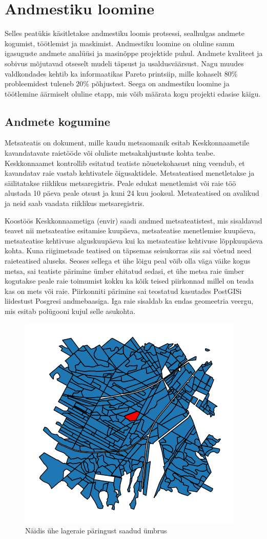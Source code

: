 \section{Andmestiku loomine}
Selles peatükis käsitletakse andmestiku loomis protsessi, sealhulgas andmete kogumist, töötlemist ja maskimist. Andmestiku loomine on oluline samm igasuguste andmete analüüsi ja masinõppe projektide puhul. Andmete kvaliteet ja sobivus mõjutavad otseselt mudeli täpsust ja usaldusväärsust. Nagu muudes valdkondades kehtib ka informaatikas Pareto printsiip, mille kohaselt 80\% probleemidest tuleneb 20\% põhjustest. Seega on andmestiku loomine ja töötlemine äärmiselt oluline etapp, mis võib määrata kogu projekti edasise käigu.

\subsection{Andmete kogumine}
Metsateatis on dokument, mille kaudu metsaomanik esitab Keskkonnaametile
kavandatavate raietööde või oluliste metsakahjustuste kohta teabe. Keskkonnaamet
kontrollib esitatud teatiste nõuetekohasust ning veendub, et kavandatav raie
vastab kehtivatele õigusaktidele. Metsateatised menetletakse ja säilitatakse
riiklikus metsaregistris. Peale edukat menetlemist või raie töö alustada 10 päeva peale otsust ja kuni 24 kuu jooksul. \cite{MetsateatisJaMetsaregister} Metsateatised on avalikud ja neid saab vaadata riiklikus metsaregistris.

Koostöös Keskkonnaametiga (envir) saadi andmed metsateatistest, mis sisaldavad teavet nii metsateatise esitamise kuupäeva, metsateatise menetlemise kuupäeva, metsateatise kehtivuse alguskuupäeva kui ka metsateatise kehtivuse lõppkuupäeva kohta. Kuna riigimetsade teatised on täpsemas seisukorras siis sai võetud need raieteatised aluseks. Seoses sellega et ühe lõigu peal võib olla väga väike kogus metsa, sai teatiste pärimine ümber ehitatud sedasi, et ühe metsa raie ümber kogutakse peale raie toimumist kokku ka kõik teised piirkonnad millel on teada kas on mets või raie. Piirkonniti pärimine sai teostatud kasutades PostGISi liidestust Posgresi andmebaasiga. Iga raie sisaldab ka endas geomeetria veergu, mis esitab polügooni kujul selle asukohta. 

\begin{figure}[hb]
    \centering
    \includegraphics[width=.5\textwidth]{figures/andmestik/er_id_is10124223.png}
    \caption{Näidis ühe lageraie päringust saadud ümbrus}
    \label{fig:umbrusexample}
\end{figure}

